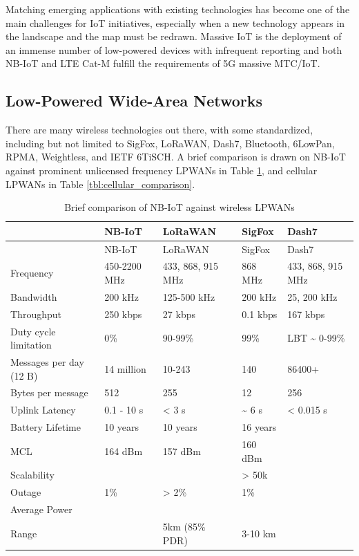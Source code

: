 \documentclass[]{article}
\begin{document}
Matching emerging applications with existing technologies has become one
of the main challenges for IoT initiatives, especially when a new
technology appears in the landscape and the map must be redrawn. Massive
IoT is the deployment of an immense number of low-powered devices with
infrequent reporting and both NB-IoT and LTE Cat-M fulfill the
requirements of 5G massive MTC/IoT.

\hypertarget{lpwans}{%
\subsection{Low-Powered Wide-Area Networks}\label{lpwans}}

There are many wireless technologies out there, with some standardized,
including but not limited to SigFox, LoRaWAN, Dash7, Bluetooth, 6LowPan,
RPMA, Weightless, and IETF 6TiSCH. A brief comparison is drawn on NB-IoT
against prominent unlicensed frequency LPWANs in Table
\ref{tbl:lpwan_comparison}, and cellular LPWANs in Table
\ref{tbl:cellular_comparison}.

\begin{longtable}[]{@{}lllll@{}}
\caption{Brief comparison of NB-IoT against wireless LPWANs
\label{tbl:lpwan_comparison}}\tabularnewline
\toprule
& NB-IoT & LoRaWAN & SigFox & Dash7\tabularnewline
\midrule
\endfirsthead
\toprule
& NB-IoT & LoRaWAN & SigFox & Dash7\tabularnewline
\midrule
\endhead
Frequency & 450-2200 MHz & 433, 868, 915 MHz & 868 MHz & 433, 868, 915
MHz\tabularnewline
Bandwidth & 200 kHz & 125-500 kHz & 200 kHz & 25, 200 kHz\tabularnewline
Throughput & 250 kbps & 27 kbps & 0.1 kbps & 167 kbps\tabularnewline
Duty cycle limitation & 0\% & 90-99\% & 99\% & LBT \textasciitilde{}
0-99\%\tabularnewline
Messages per day (12 B) & 14 million & 10-243 & 140 &
86400+\tabularnewline
Bytes per message & 512 & 255 & 12 & 256\tabularnewline
Uplink Latency & 0.1 - 10 s & \textless{} 3 s & \textasciitilde{} 6 s &
\textless{} 0.015 s\tabularnewline
Battery Lifetime & 10 years & 10 years & 16 years &\tabularnewline
MCL & 164 dBm & 157 dBm & 160 dBm &\tabularnewline
Scalability & & & \textgreater{} 50k &\tabularnewline
Outage & 1\% & \textgreater{} 2\% & 1\% &\tabularnewline
Average Power & & & &\tabularnewline
Range & & 5km (85\% PDR) & 3-10 km &\tabularnewline
\bottomrule
\end{longtable}
\end{document}
